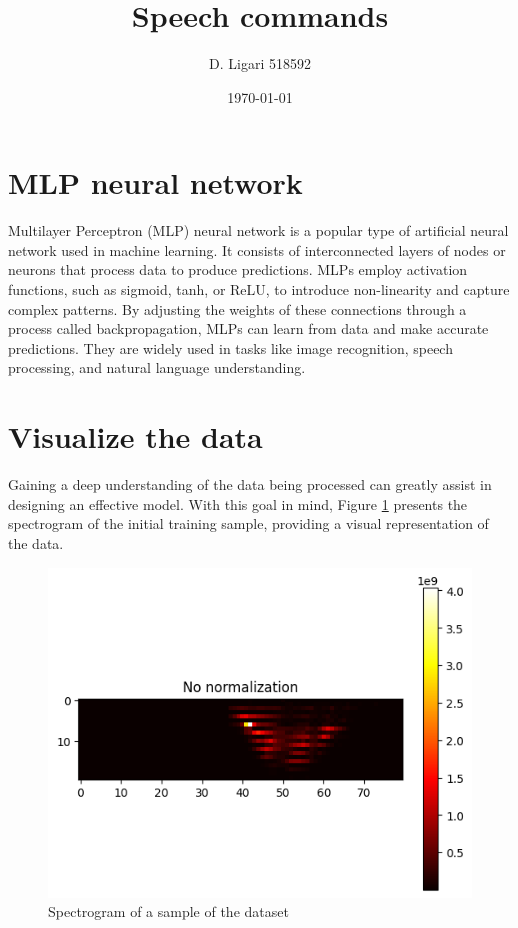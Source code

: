 \documentclass{class}
\title{Speech commands}
\author[1]{D. Ligari 518592}
\affil[1]{Machine Learning course, University of Pavia, Department of Computer Engineering (Data Science), Pavia, Italy}
\date{\today}
\begin{document}
\maketitle
\thispagestyle{FirstPage}
\section{MLP neural network}
Multilayer Perceptron (MLP) neural network is a popular type of artificial neural network used in machine learning.
It consists of interconnected layers of nodes or neurons that process data to produce predictions.
MLPs employ activation functions, such as sigmoid, tanh, or ReLU, to introduce non-linearity and capture complex patterns.
By adjusting the weights of these connections through a process called backpropagation, MLPs can learn from data and make accurate predictions.
They are widely used in tasks like image recognition, speech processing, and natural language understanding.

\section{Visualize the data}
Gaining a deep understanding of the data being processed can greatly assist in designing an effective model.
With this goal in mind, Figure \ref{fig-1} presents the spectrogram of the initial training sample, providing a visual representation of the data.

\begin{figure}[H]
  \centering
  \includegraphics[width=.6\columnwidth]{images/sample_spectrogram.png}
  \caption{Spectrogram of a sample of the dataset}
  \label{fig-1}
\end{figure}
\end{document}
